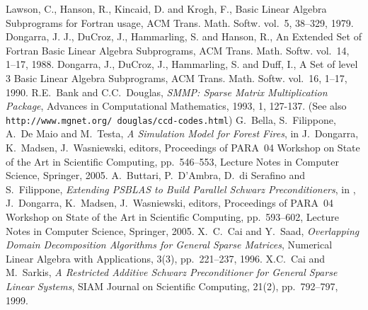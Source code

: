 \documentclass[10pt,a4paper,twoside]{article}
\begin{document}


\begingroup
  \renewcommand*{\thepage}{toc}
  \setcounter{page}{1}    %
  \tableofcontents
\endgroup  

\newpage

\setcounter{page}{1}    %












\clearpage

\begin{thebibliography}{99}
%
Lawson, C.,  Hanson, R., Kincaid, D. and Krogh, F.,
   Basic {L}inear {A}lgebra {S}ubprograms for {F}ortran usage,
{ACM Trans. Math. Softw.} vol.~{5}, 38--329, 1979.
 Dongarra, J. J.,  DuCroz, J.,  Hammarling, S. and Hanson, R.,
An Extended Set of {F}ortran {B}asic {L}inear {A}lgebra {S}ubprograms,
{ACM Trans. Math. Softw.} vol.~{14}, 1--17, 1988.
  Dongarra, J., DuCroz, J., Hammarling, S. and Duff, I.,
A  Set of level 3 Basic Linear Algebra Subprograms,
{ACM Trans. Math. Softw.} vol.~{16}, 1--17, 1990.
R.E.~Bank and C.C.~Douglas,
{\em SMMP: Sparse Matrix Multiplication Package}, 
Advances in Computational Mathematics, 1993, 1, 127-137.
(See also {\tt http://www.mgnet.org/~douglas/ccd-codes.html}) 
%
G.~Bella, S.~Filippone, A.~De Maio and M.~Testa,
{\em A Simulation Model for Forest Fires},
in J.~Dongarra, K.~Madsen, J.~Wasniewski, editors,
Proceedings of PARA~04 Workshop on State of the Art
in Scientific Computing, pp.~546--553, Lecture Notes in Computer Science,
Springer, 2005.
%
A.~Buttari, P.~D'Ambra, D.~di Serafino and S.~Filippone,
{\em Extending PSBLAS to Build Parallel Schwarz Preconditioners},
in , J.~Dongarra, K.~Madsen, J.~Wasniewski, editors,
Proceedings of PARA~04 Workshop on State of the Art
in Scientific Computing, pp.~593--602, Lecture Notes in Computer Science,
Springer, 2005.
%
X.~C.~Cai and Y.~Saad,
{\em Overlapping Domain Decomposition Algorithms for General Sparse Matrices},
Numerical Linear Algebra with Applications, 3(3), pp.~221--237, 1996.
%
X.C.~Cai and M.~Sarkis,
{\em A Restricted Additive Schwarz Preconditioner for General Sparse Linear Systems},
SIAM Journal on Scientific Computing, 21(2), pp.~792--797, 1999.

\end{thebibliography}
\end{document}

